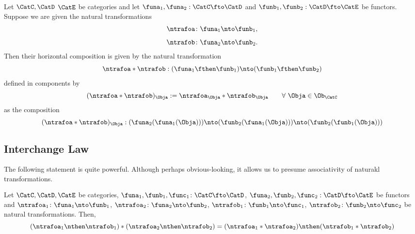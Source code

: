 \begin{ctdefinition}
    \label{def:horizontal-composition}
    Let $\CatC, \CatD$ $\CatE$ be categories and let $\funa_1,\funa_2:\CatC \fto \CatD$ and $\funb_1,\funb_2:\CatD \fto \CatE$ be functors.
    Suppose we are given the natural transformations
    \begin{equation}
        \ntrafoa \colon \funa_1 \nto \funb_1,
    \end{equation}
    \begin{equation}
        \ntrafob \colon \funa_2 \nto \funb_2.
    \end{equation}
    Then their horizontal composition is given by the natural transformation
    \begin{equation}
        \ntrafoa * \ntrafob: (\funa_1 \fthen \funb_1) \nto (\funb_1 \fthen \funb_2)
    \end{equation}
    defined in components by
    \begin{equation}
        (\ntrafoa * \ntrafob)_{\Obja} := \ntrafoa_{\Obja} * \ntrafob_{\Obja} \quad \quad \forall \ \Obja \in \Ob_\CatC
    \end{equation}
    as the composition 
    \begin{equation}
        (\ntrafoa * \ntrafob)_{\Obja} : (\funa_2(\funa_1(\Obja))) \nto (\funb_2(\funa_1(\Obja))) \nto (\funb_2(\funb_1(\Obja)))
    \end{equation}
\end{ctdefinition}


\subsection{Interchange Law}

The following statement is quite powerful. Although perhaps obvious-looking, it allows us to presume associativity of 
naturakl transformations. 

\begin{proposition}[Interchange]
Let $\CatC, \CatD, \CatE$ be categories, $\funa_1, \funb_1, \func_1\colon\CatC \fto \CatD$, $\funa_2, \funb_2, \func_2:\CatD \fto \CatE$ be functors and $\ntrafoa_1\colon\funa_1\nto\funb_1$, $\ntrafoa_2\colon\funa_2\nto\funb_2$, $\ntrafob_1\colon\funb_1\nto\func_1$, $\ntrafob_2\colon\funb_2\nto\func_2$ be natural transformations. Then, 
\begin{equation}
    (\ntrafoa_1 \nthen \ntrafob_1) * (\ntrafoa_2 \nthen \ntrafob_2) = 
    (\ntrafoa_1 * \ntrafoa_2) \nthen (\ntrafob_1 * \ntrafob_2)
\end{equation}
\end{proposition}

